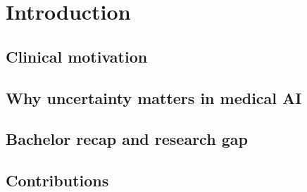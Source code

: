 \chapter{Introduction}
\label{ch:introduction}


\section{Clinical motivation}

\section{Why uncertainty matters in medical AI}

\section{Bachelor recap and research gap}

\section{Contributions}

